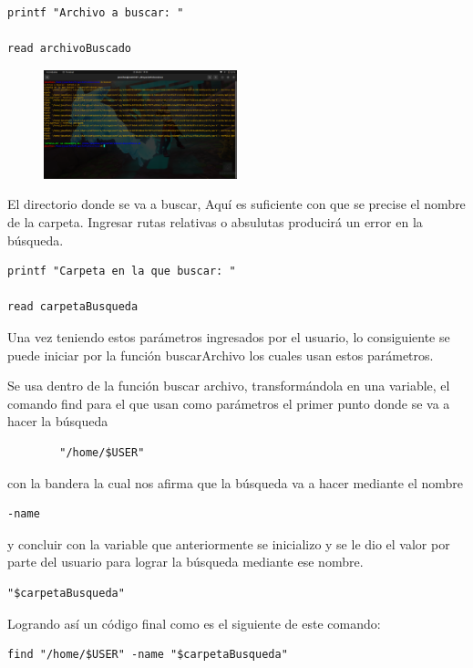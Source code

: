 \documentclass[letterpaper,12pt]{article} %
\begin{document}
\begin{verbatim}
printf "Archivo a buscar: "

read archivoBuscado
\end{verbatim}
\begin{figure}[H]
    \centering
    \includegraphics[width=0.5\textwidth]{figurasShell/Buscar1.png}
\end{figure}
El directorio donde se va a buscar, Aquí es suficiente con que se precise el nombre de la carpeta. Ingresar rutas relativas o absulutas producirá un error en la búsqueda.
    
\begin{verbatim}
printf "Carpeta en la que buscar: "

read carpetaBusqueda
\end{verbatim}

Una vez teniendo estos parámetros ingresados por el usuario, lo consiguiente se puede iniciar por la función buscarArchivo los cuales usan estos parámetros.

Se usa dentro de la función buscar archivo, transformándola en una variable, el comando find para el que usan como parámetros el primer punto donde se va a hacer la búsqueda
\begin{verbatim}
        "/home/$USER"
\end{verbatim}

con la bandera la cual nos afirma que la búsqueda va a hacer mediante el nombre 

\begin{verbatim}
-name
\end{verbatim}

y concluir con la variable que anteriormente se inicializo y se le dio el valor por parte del usuario para lograr la búsqueda mediante ese nombre.

\begin{verbatim}
"$carpetaBusqueda"
\end{verbatim}

Logrando así un código final como es el siguiente de este comando:

\begin{verbatim}
find "/home/$USER" -name "$carpetaBusqueda"
\end{verbatim}
\end{document}
